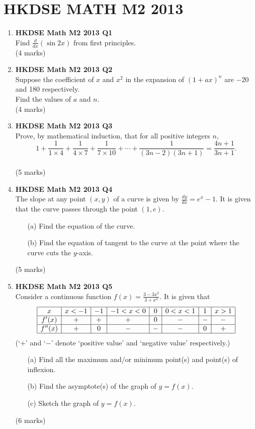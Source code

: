 \documentclass{report}
\begin{document}
\chapter{HKDSE MATH M2 2013}
\begin{enumerate}
	\item \textbf{HKDSE Math M2 2013 Q1}\\
	Find $\displaystyle\frac{d}{dx} (\sin{2x})$ from first principles. \\(4 marks)

	\item \textbf{HKDSE Math M2 2013 Q2}\\
	Suppose the coefficient of $x$ and $x^2$ in the expansion of $(1+ax)^n$ are $-20$ and 180 respectively. \\
	Find the values of $a$ and $n$. \\(4 marks)

	\item \textbf{HKDSE Math M2 2013 Q3}\\
	Prove, by mathematical induction, that for all positive integers $n$, $$\displaystyle 1 + \frac{1}{1 \times 4} + \frac{1}{4 \times 7} + \frac{1}{7 \times 10} + \cdots + \frac{1}{(3n-2)(3n+1)} = \frac{4n+1}{3n+1}.$$ \\(5 marks)

	\item \textbf{HKDSE Math M2 2013 Q4}\\
	The slope at any point $(x,y)$ of a curve is given by $\displaystyle\frac{dy}{dx} = e^x - 1$. It is given that the curve passes through the point $(1,e)$. 
	\begin{enumerate}
		\item [(a)]Find the equation of the curve.
		\item [(b)]Find the equation of tangent to the curve at the point where the curve cuts the $y$-axis.
	\end{enumerate}
	(5 marks)

	\item \textbf{HKDSE Math M2 2013 Q5}\\
	Consider a continuous function $f(x) = \displaystyle\frac{3 -3x^2}{3+x^2}$. It is given that $$\begin{array}{|c|c|c|c|c|c|c|c|}
		\hline
		x & x<-1 & -1 & -1<x<0 & 0 & 0<x<1 & 1 & x>1\\
		\hline
		f'(x) & + & + & + & 0 & - & - & -\\
		\hline		
		f''(x) & + & 0 & - & - & - & 0 & +\\
		\hline
    \end{array}$$
	(`$+$' and `$-$' denote `positive value' and `negative value' respectively.)
	\begin{enumerate}
		\item [(a)]Find all the maximum and/or minimum point(s) and point(s) of inflexion.
		\item [(b)]Find the asymptote(s) of the graph of $y = f(x)$. 
		\item [(c)]Sketch the graph of $y = f(x)$.
	\end{enumerate}
	(6 marks)


\end{enumerate}
\end{document}
